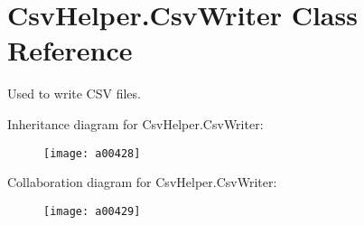 \hypertarget{a00071}{\section{Csv\-Helper.\-Csv\-Writer Class Reference}
\label{a00071}
}


Used to write C\-S\-V files.  




Inheritance diagram for Csv\-Helper.\-Csv\-Writer\-:
\nopagebreak
\begin{figure}[H]
\begin{center}
\leavevmode
\texttt{[image: a00428]}
\end{center}
\end{figure}


Collaboration diagram for Csv\-Helper.\-Csv\-Writer\-:
\nopagebreak
\begin{figure}[H]
\begin{center}
\leavevmode
\texttt{[image: a00429]}
\end{center}
\end{figure}
